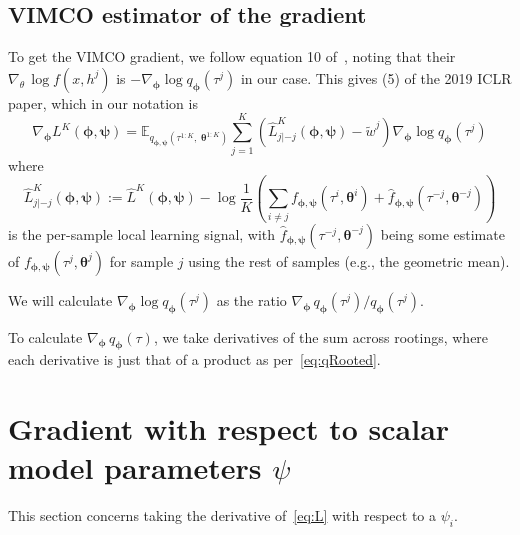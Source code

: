\documentclass{article}
\begin{document}
\subsection*{VIMCO estimator of the gradient}


To get the VIMCO gradient, we follow equation 10 of~\cite{Mnih2016-ec}, noting that their $\nabla_\theta \, \log f(x, h^j)$ is $-\nabla_{\bm{\phi}} \log q_{\bm{\phi}}(\tau^j)$ in our case.
This gives (5) of the 2019 ICLR paper, which in our notation is
\[
\nabla_{\bm{\phi}} L^K(\bm{\phi},{\bm{\psi}}) = \mathbb{E}_{q_{\bm{\phi},{\bm{\psi}}}(\tau^{1:K},\;\bm{\theta}^{1:K})}\sum_{j=1}^K\left(\hat{L}_{j|-j}^K(\bm{\phi},{\bm{\psi}})-\tilde{w}^j\right)\nabla_{\bm{\phi}}\log q_{\bm{\phi}}(\tau^j)
\]
where
\[
\hat{L}_{j|-j}^K(\bm{\phi},{\bm{\psi}}) :=  \hat{L}^K(\bm{\phi},{\bm{\psi}}) - \log\frac1K\left(\sum_{i\neq j}f_{\bm{\phi},{\bm{\psi}}}(\tau^i,\bm{\theta}^i) + \hat{f}_{\bm{\phi},{\bm{\psi}}}(\tau^{-j},\bm{\theta}^{-j})\right)
\]
is the per-sample local learning signal, with $\hat{f}_{\bm{\phi},{\bm{\psi}}}(\tau^{-j},\bm{\theta}^{-j})$ being some estimate of $f_{\bm{\phi},{\bm{\psi}}}(\tau^j,\bm{\theta}^j)$ for sample $j$ using the rest of samples (e.g., the geometric mean).

We will calculate $\nabla_{\bm \phi} \log q_{\bm \phi}(\tau^j)$ as the ratio ${\nabla_{\bm \phi} \, q_{\bm{\phi}}(\tau^j)} / {q_{\bm{\phi}}(\tau^j)}$.

To calculate $\nabla_{\bm \phi} \, q_{\bm{\phi}}(\tau)$, we take derivatives of the sum across rootings, where each derivative is just that of a product as per~\eqref{eq:qRooted}.


\section*{Gradient with respect to scalar model parameters $\psi$}

This section concerns taking the derivative of~\eqref{eq:L} with respect to a $\psi_i$.
\end{document}
